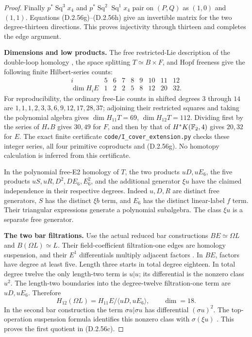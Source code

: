 \begin{proof}
Finally $p^*\operatorname{Sq}^3x_4$ and
$p^*\operatorname{Sq}^2\operatorname{Sq}^1x_4$ pair on
$(P,Q)$ as $(1,0)$ and $(1,1)$.  Equations
\textup{(D.2.56g)--(D.2.56h)} give an invertible matrix
for the two degree-thirteen directions.  This proves
injectivity through thirteen and completes the edge argument.

\textbf{Dimensions and low products.}
The free restricted-Lie description of the double-loop homology
\cite[Chapter III, Theorems 3.1--3.2 and Lemma 3.8]
{I_CohenLadaMay1976}, the space splitting $T\simeq B\times F$,
and Hopf freeness give the following finite Hilbert-series counts:
\[
 \begin{array}{c|rrrrrrrr}
 i&5&6&7&8&9&10&11&12\\\hline
 \dim H_iE&1&2&2&5&8&12&20&32.
 \end{array}
 \tag{D.2.56i}
\]
For reproducibility, the ordinary free-Lie counts in shifted
degrees $3$ through $14$ are
$1,1,1,2,3,3,6,9,12,17,28,37$; adjoining their restricted
squares and taking the polynomial algebra gives
$\dim H_{11}T=69$, $\dim H_{12}T=112$.
Dividing first by the series of $H_*B$ gives $30,49$
for $F$, and then by that of $H^*K(\mathbb F_2,4)$ gives
$20,32$ for $E$.  The exact finite certificate
\texttt{code/I\_cover\_extension.py} checks these integer
series, all four primitive coproducts and
\textup{(D.2.56g)}.  No homotopy calculation is inferred
from this certificate.

In the polynomial free-E2 homology of $T$, the two products
$uD,uE_6$, the five products
$uS,uR,D^2,DE_6,E_6^2$, and the additional generator
$\xi u$ have the claimed independence in their respective
degrees.  Indeed $u,D,R$ are distinct free generators,
$S$ has the distinct $\xi b$ term, and $E_6$ has the
distinct linear-label $f$ term.  Their triangular expressions
generate a polynomial subalgebra.  The class $\xi u$ is
a separate free generator.

\textbf{The two bar filtrations.}
Use the actual reduced bar constructions $BE\simeq\Omega L$
and $B(\Omega L)\simeq L$.  Their field-coefficient
filtration-one edges are homology suspension, and their
$E^1$ differentials multiply adjacent factors
\cite[Chapter 1, Theorem 1.5 and its footnote, p.~7]
{I_MadsenMilgram1979}.  In $BE$, factors have degree at
least five.  Length three starts in total degree eighteen.
In total degree twelve the only length-two term is $u|u$;
its differential is the nonzero class $u^2$.
The length-two boundaries into the degree-twelve
filtration-one term are $uD,uE_6$.  Therefore
\[
 H_{12}(\Omega L)=H_{11}E/\langle uD,uE_6\rangle,
                  \qquad\dim=18.
 \tag{D.2.56j}
\]
In the second bar construction the term
$\sigma u|\sigma u$ has differential $(\sigma u)^2$.
The top-operation suspension formula identifies this
nonzero class with $\sigma(\xi u)$
\cite[Chapter III, Theorem 1.4(2), with Theorem 1.1(2)]
{I_CohenLadaMay1976}.  This proves the first quotient in
\textup{(D.2.56c)}.


\end{proof}
